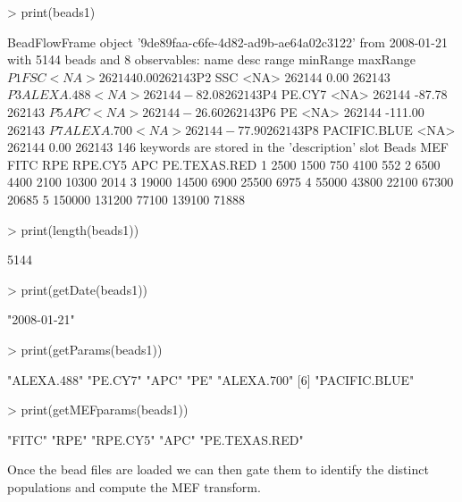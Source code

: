 \documentclass[11pt]{article}
\begin{document}
\begin{Schunk}
\begin{Sinput}
> print(beads1)
\end{Sinput}
\begin{Soutput}
BeadFlowFrame object '9de89faa-c6fe-4d82-ad9b-ae64a02c3122'
from 2008-01-21
with 5144 beads and 8 observables:
            name desc  range minRange maxRange
$P1          FSC <NA> 262144     0.00   262143
$P2          SSC <NA> 262144     0.00   262143
$P3    ALEXA.488 <NA> 262144   -82.08   262143
$P4       PE.CY7 <NA> 262144   -87.78   262143
$P5          APC <NA> 262144   -26.60   262143
$P6           PE <NA> 262144  -111.00   262143
$P7    ALEXA.700 <NA> 262144   -77.90   262143
$P8 PACIFIC.BLUE <NA> 262144     0.00   262143
146 keywords are stored in the 'description' slot
Beads MEF
    FITC    RPE RPE.CY5    APC PE.TEXAS.RED
1   2500   1500     750   4100          552
2   6500   4400    2100  10300         2014
3  19000  14500    6900  25500         6975
4  55000  43800   22100  67300        20685
5 150000 131200   77100 139100        71888
\end{Soutput}
\end{Schunk}

\begin{Schunk}
\begin{Sinput}
> print(length(beads1))
\end{Sinput}
\begin{Soutput}
[1] 5144
\end{Soutput}
\begin{Sinput}
> print(getDate(beads1))
\end{Sinput}
\begin{Soutput}
[1] "2008-01-21"
\end{Soutput}
\begin{Sinput}
> print(getParams(beads1))
\end{Sinput}
\begin{Soutput}
[1] "ALEXA.488"    "PE.CY7"       "APC"          "PE"           "ALEXA.700"   
[6] "PACIFIC.BLUE"
\end{Soutput}
\begin{Sinput}
> print(getMEFparams(beads1))
\end{Sinput}
\begin{Soutput}
[1] "FITC"         "RPE"          "RPE.CY5"      "APC"          "PE.TEXAS.RED"
\end{Soutput}
\end{Schunk}


\noindent
Once the bead files are loaded we can then gate them to identify the distinct populations and compute the MEF transform.
\end{document}
